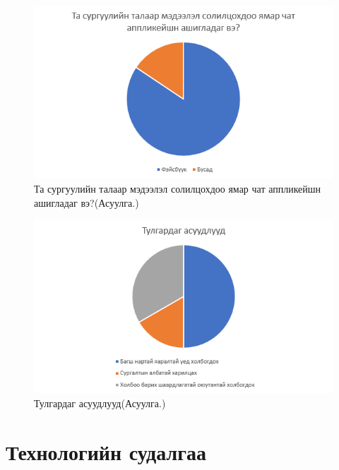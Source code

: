 \begin{figure}[htbp]
	\centering
	\includegraphics[scale=0.5]{Chart/Chart2}
	\caption[Хэрэглэгчийн судалгаа]{Та сургуулийн талаар мэдээлэл солилцохдоо ямар чат аппликейшн ашигладаг вэ?(Асуулга.)}
	\label{fig:Chart2}
\end{figure}

\begin{figure}[htbp]
	\centering
	\includegraphics[scale=0.5]{Chart/Chart3}
	\caption[Хэрэглэгчийн судалгаа]{Тулгардаг асуудлууд(Асуулга.)}
	\label{fig:Chart3}
\end{figure}


\section{Технологийн судалгаа}

